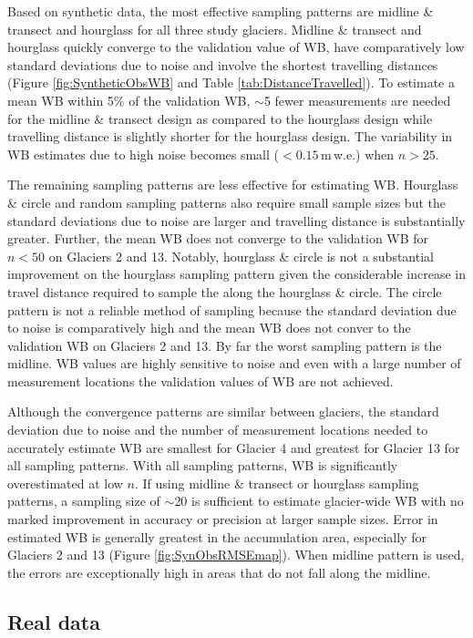 \documentclass[twocolumn,letterpaper]{igs}
\begin{document}
Based on synthetic data, the most effective sampling patterns are midline \& transect and hourglass for all three study glaciers. Midline \& transect and hourglass quickly converge to the validation value of WB, have comparatively low standard deviations due to noise and involve the shortest travelling distances (Figure \ref{fig:SyntheticObsWB} and Table \ref{tab:DistanceTravelled}). To estimate a mean WB within 5\% of the validation WB, $\sim$5 fewer measurements are needed for the midline \& transect design as compared to the hourglass design while travelling distance is slightly shorter for the hourglass design. The variability in WB estimates due to high noise becomes small ($<0.15$\,m\,w.e.) when $n>25$.

The remaining sampling patterns are less effective for estimating WB. Hourglass \& circle and random sampling patterns also require small sample sizes but the standard deviations due to noise are larger and travelling distance is substantially greater. Further, the mean WB does not converge to the validation WB for $n<50$ on Glaciers 2 and 13. Notably, hourglass \& circle is not a substantial improvement on the hourglass sampling pattern given the considerable increase in travel distance required to sample the along the hourglass \& circle. The circle pattern is not a reliable method of sampling because the standard deviation due to noise is comparatively high and the mean WB does not conver to the validation WB on Glaciers 2 and 13. By far the worst sampling pattern is the midline. WB values are highly sensitive to noise and even with a large number of measurement locations the validation values of WB are not achieved. 

Although the convergence patterns are similar between glaciers, the standard deviation due to noise and the number of measurement locations needed to accurately estimate WB are smallest for Glacier 4 and greatest for Glacier 13 for all sampling patterns. With all sampling patterns, WB is significantly overestimated at low $n$. If using midline \& transect or hourglass sampling patterns, a sampling size of $\sim$20 is sufficient to estimate glacier-wide WB with no marked improvement in accuracy or precision at larger sample sizes. 
Error in estimated WB is generally greatest in the accumulation area, especially for Glaciers 2 and 13 (Figure \ref{fig:SynObsRMSEmap}). When midline pattern is used, the errors are exceptionally high in areas that do not fall along the midline.

\subsection{Real data}
\end{document}
